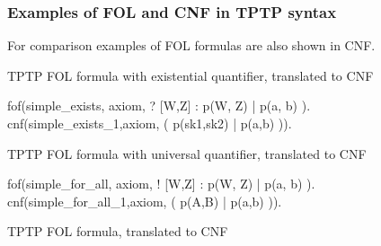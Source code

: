 \subsubsection{Examples of FOL and CNF in TPTP syntax}

For comparison examples of \gls{FOL} formulas are also shown in CNF. 

\begin{listing}[H]
  \caption{TPTP FOL formula with existential quantifier, translated to CNF}
\begin{tptpcode}
fof(simple_exists, axiom,
 ? [W,Z] : p(W, Z) | p(a, b)
  ).
cnf(simple_exists_1,axiom,
    ( p(sk1,sk2) | p(a,b) )).
\end{tptpcode}
\end{listing}

\begin{listing}[H]
  \caption{TPTP FOL formula with universal quantifier, translated to CNF}
\begin{tptpcode}
fof(simple_for_all, axiom,
 ! [W,Z] : p(W, Z) | p(a, b)
  ).
cnf(simple_for_all_1,axiom,
    ( p(A,B) | p(a,b) )).
\end{tptpcode}
\end{listing}

\begin{listing}[H]
  \caption{TPTP FOL formula, translated to CNF}
\end{listing}

